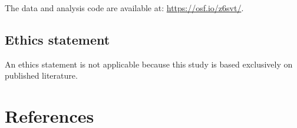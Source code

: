 \documentclass[
  ,pub,floatsintext]{apa6}
\begin{document}
The data and analysis code are available at: \url{https://osf.io/z6svt/}.

\hypertarget{ethics-statement}{%
\subsection{Ethics statement}\label{ethics-statement}}

An ethics statement is not applicable because this study is based exclusively on published literature.

\hypertarget{references}{%
\section{References}\label{references}}

\scriptsize
\end{document}
